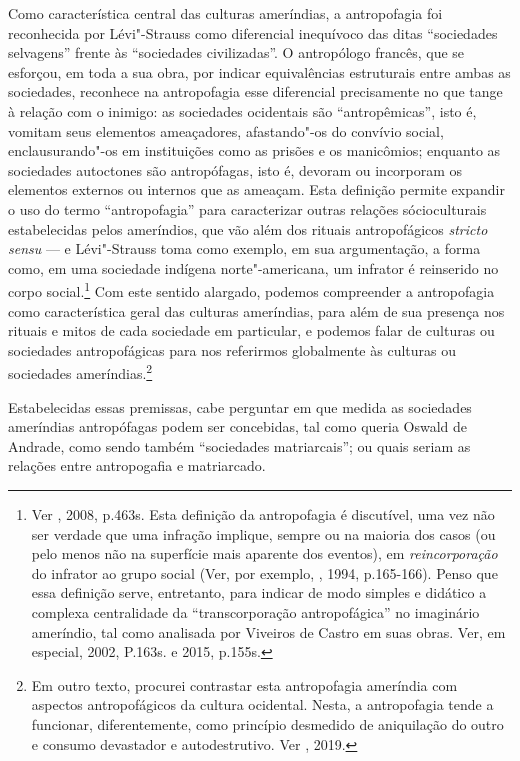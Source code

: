 Como característica central das culturas ameríndias, a antropofagia foi
reconhecida por Lévi"-Strauss como diferencial inequívoco das ditas
``sociedades selvagens'' frente às ``sociedades civilizadas''. O
antropólogo francês, que se esforçou, em toda a sua obra, por indicar
equivalências estruturais entre ambas as sociedades, reconhece na
antropofagia esse diferencial precisamente no que tange à relação com o
inimigo: as sociedades ocidentais são ``antropêmicas'', isto é, vomitam
seus elementos ameaçadores, afastando"-os do convívio social,
enclausurando"-os em instituições como as prisões e os manicômios;
enquanto as sociedades autoctones são antropófagas, isto é, devoram ou
incorporam os elementos externos ou internos que as ameaçam. Esta
definição permite expandir o uso do termo ``antropofagia'' para
caracterizar outras relações sócioculturais estabelecidas pelos
ameríndios, que vão além dos rituais antropofágicos \emph{stricto sensu}
--- e Lévi"-Strauss toma como exemplo, em sua argumentação, a forma como,
em uma sociedade indígena norte"-americana, um infrator é reinserido no
corpo social.\footnote{Ver , 2008, p.463s. Esta definição da
  antropofagia é discutível, uma vez não ser verdade que uma infração
  implique, sempre ou na maioria dos casos (ou pelo menos não na
  superfície mais aparente dos eventos), em \emph{reincorporação} do
  infrator ao grupo social (Ver, por exemplo, , 1994, p.165-166).
  Penso que essa definição serve, entretanto, para indicar de modo
  simples e didático a complexa centralidade da ``transcorporação
  antropofágica'' no imaginário ameríndio, tal como analisada por
  Viveiros de Castro em suas obras. Ver, em especial, 
  2002, P.163s. e 2015, p.155s.} Com este sentido alargado, podemos
compreender a antropofagia como característica geral das culturas
ameríndias, para além de sua presença nos rituais e mitos de cada
sociedade em particular, e podemos falar de culturas ou sociedades
antropofágicas para nos referirmos globalmente às culturas ou sociedades
ameríndias.\footnote{Em outro texto, procurei contrastar esta
  antropofagia ameríndia com aspectos antropofágicos da cultura
  ocidental. Nesta, a antropofagia tende a funcionar, diferentemente,
  como princípio desmedido de aniquilação do outro e consumo devastador
  e autodestrutivo. Ver , 2019.}

Estabelecidas essas premissas, cabe perguntar em que medida as
sociedades ameríndias antropófagas podem ser concebidas, tal como queria
Oswald de Andrade, como sendo também ``sociedades matriarcais''; ou
quais seriam as relações entre antropogafia e matriarcado.

